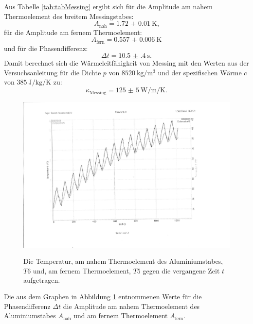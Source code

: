 Aus Tabelle \ref{tab:tabMessing} ergibt sich für die Amplitude am nahem Thermoelement des breitem Messingstabes:
\begin{displaymath}
A_\text{nah} = \SI{1.72(1)}{\kelvin}\text{,}
\end{displaymath}
für die Amplitude am fernem Thermoelement:
\begin{displaymath}
A_\text{fern} = \SI{0.557(6)}{\kelvin}
\end{displaymath}
und für die Phasendifferenz:
\begin{displaymath}
\Delta t = \SI{10.5(4)}{\second}\text{.}
\end{displaymath}
Damit berechnet sich die Wärmeleitfähigkeit von Messing mit den Werten aus der Versuchsanleitung \cite{V204} für die Dichte $p$ von $\SI{8520}{\kilo\gram\per\meter\tothe{3}}$ und der spezifischen Wärme $c$ von $\SI{385}{\joule\per\kilo\gram\per\kelvin}$ zu:
\begin{displaymath}
\kappa_\text{Messing} = \SI{125(5)}{\watt\per\meter\per\kelvin}\text{.}
\end{displaymath}
\begin{figure}
	\centering
	\caption{Die Temperatur, am nahem Thermoelement des Aluminiumstabes, $T6$ und, am fernem Thermoelement, $T5$ gegen die vergangene Zeit $t$ aufgetragen.}
	\includegraphics[width=\linewidth-70pt,height=\textheight-70pt,keepaspectratio]{content/Bilder/T5T6-rotated.pdf}
	\label{fig:Graph6}
\end{figure}
\begin{table}
	\centering
	\caption{Die aus dem Graphen in Abbildung \ref{fig:Graph6} entnommenen Werte für die Phasendifferenz $\Delta t$ die Amplitude am nahem Thermoelement des Aluminiumstabes $A_\text{nah}$ und am fernem Thermoelement $A_\text{fern}$.}
	
\end{table}

